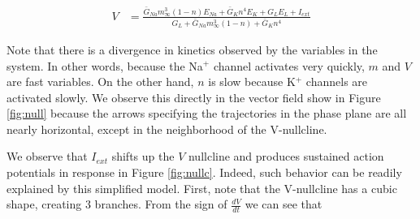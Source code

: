\documentclass{article}
\begin{document}
\begin{align*}
        V &= \frac{\bar{G}_{Na}m_\infty^3(1-n)E_{Na}+\bar{G}_Kn^4E_K + G_LE_L + I_{ext}}{G_L + \bar{G}_{Na}m_\infty^3(1-n)+ \bar{G}_Kn^4}
\end{align*}

Note that there is a divergence in kinetics observed by the variables in the system. In other words, because the Na$^+$ channel activates very quickly, $m$ and $V$ are fast variables. On the other hand, $n$ is slow because K$^+$ channels are activated slowly.\cite{keener} We observe this directly in the vector field show in Figure \ref{fig:null} because the arrows specifying the trajectories in the phase plane are all nearly horizontal, except in the neighborhood of the V-nullcline.

We observe that $I_{ext}$ shifts up the $V$ nullcline and produces sustained action potentials in response in Figure \ref{fig:nullc}. Indeed, such behavior can be readily explained by this simplified model. First, note that the V-nullcline has a cubic shape, creating 3 branches. From the sign of $\frac{dV}{dt}$ we can see that
\end{document}

